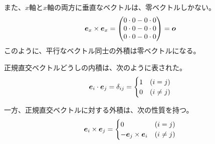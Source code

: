 \documentclass[../../../topic_linear-algebra]{subfiles}
\begin{document}
\br

また、$x$軸と$x$軸の両方に垂直なベクトルは、零ベクトルしかない。
\begin{equation*}
  \vb*{e}_x \times \vb*{e}_x = \begin{pmatrix}
    0 \cdot 0 - 0 \cdot 0 \\
    0 \cdot 0 - 0 \cdot 0 \\
    0 \cdot 0 - 0 \cdot 0
  \end{pmatrix} = \vb*{o}
\end{equation*}
このように、平行なベクトル同士の外積は零ベクトルになる。

\br

正規直交ベクトルどうしの内積は、次のように表された。
\begin{equation*}
  \vb*{e}_i \cdot \vb*{e}_j = \delta_{ij} = \begin{cases}
    1 & (i = j) \\
    0 & (i \neq j)
  \end{cases}
\end{equation*}

一方、正規直交ベクトルに対する外積は、次の性質を持つ。
\begin{equation*}
  \vb*{e}_i \times \vb*{e}_j = \begin{cases}
    0 & (i = j) \\
    - \vb*{e}_j \times \vb*{e}_i & (i \neq j)
  \end{cases}
\end{equation*}
\end{document}
